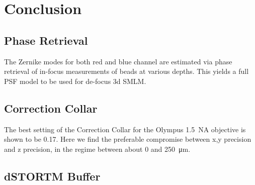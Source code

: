 \documentclass[11pt, a4paper, oneside, twocolumn]{report}
\begin{document}
\chapter{Conclusion}

\section{Phase Retrieval}

The Zernike modes for both red and blue channel are estimated via
phase retrieval of in-focus measurements of beads at various
depths. This yields a full PSF model to be used for de-focus 3d SMLM.


\section{Correction Collar}

The best setting of the Correction Collar for the Olympus 1.5~NA
objective is shown to be 0.17. Here we find the preferable compromise between x,y precision and z precision, in the regime between about 0 and 250~\si{\micro\meter}.


\section{dSTORTM Buffer}





\end{document}
